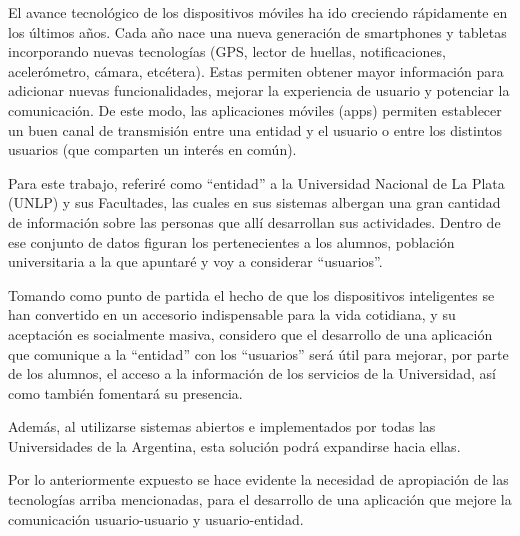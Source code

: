 El avance tecnológico de los dispositivos móviles ha ido creciendo rápidamente en los últimos años. Cada año nace una nueva generación de smartphones y tabletas incorporando nuevas tecnologías (GPS, lector de huellas, notificaciones, acelerómetro, cámara, etcétera). Estas permiten obtener mayor información para adicionar nuevas funcionalidades, mejorar la experiencia de usuario y potenciar la comunicación. De este modo, las aplicaciones móviles (apps) permiten establecer un buen canal de transmisión entre una entidad y el usuario o entre los distintos usuarios (que comparten un interés en común). 

Para este trabajo, referiré como “entidad” a la Universidad Nacional de La Plata (UNLP) y sus Facultades, las cuales en sus sistemas albergan una gran cantidad de información sobre las personas que allí desarrollan sus actividades. Dentro de ese conjunto de datos figuran los pertenecientes a los alumnos, población universitaria a la que apuntaré y voy a considerar “usuarios”.

Tomando como punto de partida el hecho de que los dispositivos inteligentes se han convertido en un accesorio indispensable para la vida cotidiana, y su aceptación es socialmente masiva, considero  que el desarrollo de una aplicación que comunique a la “entidad” con los “usuarios” será útil para mejorar, por parte de los alumnos, el acceso a la información de los servicios de la Universidad, así como también fomentará su presencia.

Además, al utilizarse sistemas abiertos e implementados por todas las Universidades de la Argentina, esta solución podrá expandirse hacia ellas.

Por lo anteriormente expuesto se hace evidente la necesidad de apropiación de las tecnologías arriba mencionadas, para el desarrollo de una aplicación que mejore la comunicación usuario-usuario y usuario-entidad.

